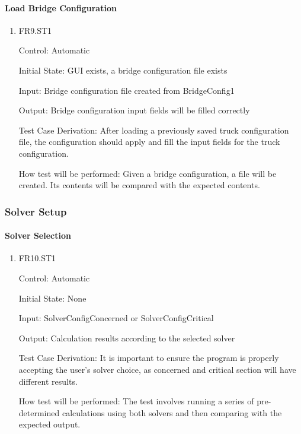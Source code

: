 \documentclass[12pt, titlepage]{article}
\begin{document}
\paragraph{Load Bridge Configuration}

\begin{enumerate}
  
  \item{FR9.ST1\\}
  
  Control: Automatic
  
  Initial State: GUI exists, a bridge configuration file exists
  
  Input: Bridge configuration file created from BridgeConfig1
  
  Output: Bridge configuration input fields will be filled correctly
  
  Test Case Derivation: After loading a previously saved truck configuration file, the configuration
  should apply and fill the input fields for the truck configuration.
  
  How test will be performed: Given a bridge configuration, a file will be created. Its contents
  will be compared with the expected contents.

\end{enumerate}

\subsubsection{Solver Setup}

\paragraph{Solver Selection}

\begin{enumerate}

  \item{FR10.ST1\\}

  Control: Automatic
            
  Initial State: None
            
  Input: SolverConfigConcerned or SolverConfigCritical
            
  Output: Calculation results according to the selected solver

  Test Case Derivation: It is important to ensure the program is properly accepting the user's solver choice, as concerned and critical section will have different results.

  How test will be performed: The test involves running a series of pre-determined calculations using both solvers and then comparing with the expected output. 
					
\end{enumerate}
\end{document}
